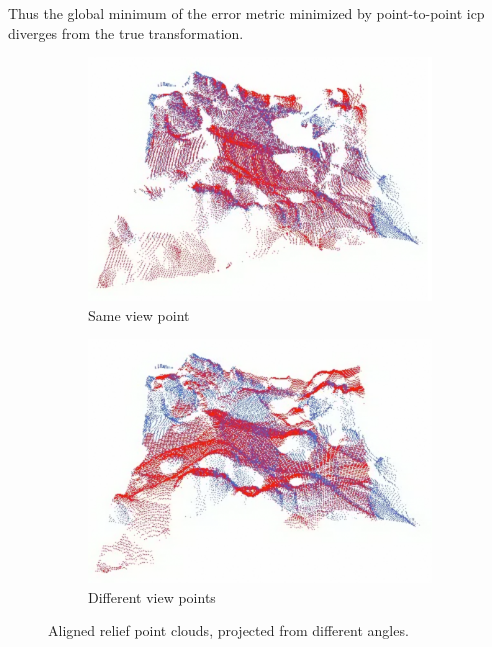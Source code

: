 Thus the global minimum of the error metric minimized by point-to-point \gls{icp} diverges from the true transformation.

\begin{figure}[h]
\centering
\begin{subfigure}{.5\textwidth}
	\includegraphics[width=\linewidth]{fig/relief_dproj_1.png}
	\caption{Same view point}
\end{subfigure}%
\begin{subfigure}{.5\textwidth}
	\includegraphics[width=\linewidth]{fig/relief_dproj_2.png}
	\caption{Different view points}
\end{subfigure}
\caption{Aligned relief point clouds, projected from different angles.}
\label{fig:relief_dproj}
\end{figure}


